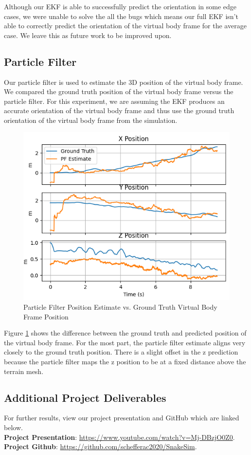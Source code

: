 \documentclass[letterpaper, 10 pt, conference]{ieeeconf}  %
\begin{document}
Although our EKF is able to successfully predict the orientation in some edge cases, we were unable to solve the all the bugs which means our full EKF isn't able to correctly predict the orientation of the virtual body frame for the average case. We leave this as future work to be improved upon.

\subsection{Particle Filter}
Our particle filter is used to estimate the 3D position of the virtual body frame. We compared the ground truth position of the virtual body frame versus the particle filter. For this experiment, we are assuming the EKF produces an accurate orientation of the virtual body frame and thus use the ground truth orientation of the virtual body frame from the simulation.

\begin{figure}[H]
    \centering
    \includegraphics[width = 0.75\linewidth]{pf.png}
    \caption{Particle Filter Position Estimate vs. Ground Truth Virtual Body Frame Position}
    \label{fig:pf_results}
\end{figure}

Figure \ref{fig:pf_results} shows the difference between the ground truth and predicted position of the virtual body frame. For the most part, the particle filter estimate aligns very closely to the ground truth position. There is a slight offset in the z prediction because the particle filter maps the z position to be at a fixed distance above the terrain mesh.


\subsection{Additional Project Deliverables}
For further results, view our project presentation and GitHub which are linked below.\\
\noindent \textbf{Project Presentation}: \href{https://www.youtube.com/watch?v=Mj-DBzjO0Z0}{https://www.youtube.com/watch?v=Mj-DBzjO0Z0}.\\
\noindent \textbf{Project Github}: \href{https://github.com/schefferac2020/SnakeSim}{https://github.com/schefferac2020/SnakeSim}.
\end{document}
